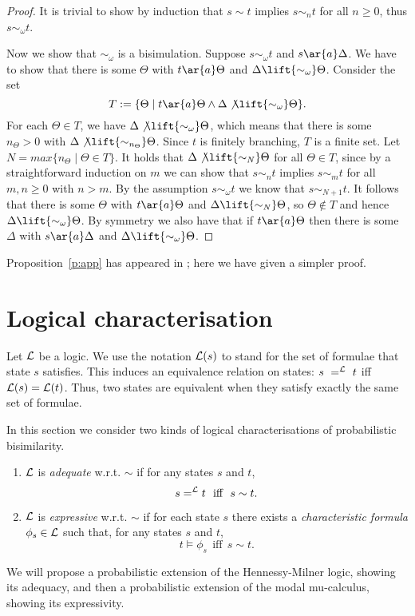 \documentclass{article}
\def \BISI{\sim}
\def \CL{{\cal L}}
\begin{document}
\begin{proof}
It is trivial to show by induction that $s\BISI t$ implies $s\BISI_n
t$ for all $n\geq 0$, thus $s\BISI_\omega t$.

Now we show that $\BISI_\omega$ is a bisimulation. Suppose
$s\BISI_\omega t$ and $s\ar{a}\Delta$. We have to show that there is
some $\Theta$ with $t\ar{a}\Theta$ and $\Delta\lift{\BISI_\omega}
\Theta$. Consider the set
\[T:=\{\Theta\mid t\ar{a}\Theta \wedge \Delta\not\lift{\BISI_\omega} \Theta\}.\]
For each $\Theta\in T$, we have $\Delta\not\lift{\BISI_\omega}
\Theta$, which means that there is some $n_{\Theta}> 0$ with
$\Delta\not\lift{\BISI_{n_{\Theta}}} \Theta$. Since $t$ is finitely
branching, $T$ is a finite set. Let $N=max\{n_{\Theta}\mid \Theta\in
T\}$. It holds that $\Delta\not\lift{\BISI_N} \Theta$ for all
$\Theta\in T$, since by a straightforward induction on $m$ we can
show that $s\BISI_n t$ implies $s\BISI_m t$ for all $m,n\geq 0$ with
$n>m$. By the assumption $s\BISI_\omega t$ we know that
$s\BISI_{N+1}t$. It follows that there is some $\Theta$ with
$t\ar{a}\Theta$ and $\Delta\lift{\BISI_N} \Theta$, so $\Theta\not\in
T$ and hence $\Delta\lift{\BISI_\omega} \Theta$. By symmetry we also
have that if $t\ar{a}\Theta$ then there is some $\Delta$ with
$s\ar{a}\Delta$ and $\Delta\lift{\BISI_\omega} \Theta$.
\end{proof}
Proposition~\ref{p:app} has appeared in \cite{Bai98}; here we have
given a simpler proof.

\section{Logical characterisation}\label{s:logic}
Let $\CL$ be a logic. We use the notation $\CL(s)$ to stand for the
set of formulae that state $s$ satisfies. This induces an
equivalence relation on states: $s\ =^\CL\ t$ iff $ \CL(s)=\CL(t)$.
Thus, two states are equivalent when they satisfy exactly the same
set of formulae.

In this section we consider two kinds of logical characterisations
of probabilistic bisimilarity.
\begin{definition}
\begin{enumerate}
\item $\CL$ is \emph{adequate} w.r.t. $\BISI$ if
for any states $s$ and $t$,
\[s=^\CL t~~\mbox{iff}~~ s\BISI t.\]

\item $\CL$ is \emph{expressive} w.r.t. $\BISI$ if for
each state $s$ there exists a \emph{characteristic formula}
$\phi_s\in\CL$ such that, for any states $s$ and $t$,
\[t\models\phi_s~~\mbox{iff}~~s\BISI t.\]
\end{enumerate}
\end{definition}
We will propose a probabilistic extension of the Hennessy-Milner
logic, showing its adequacy, and then a probabilistic extension of
the modal mu-calculus, showing its expressivity.
\end{document}
